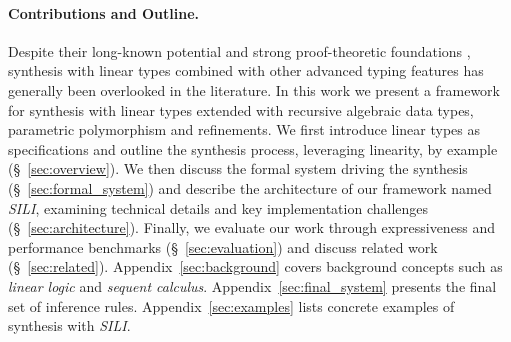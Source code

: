 \documentclass{llncs}
\newcommand{\mypara}[1]{\paragraph{\textbf{#1}.}}
\newcommand{\synname}{\emph{SILI}}
\begin{document}
\mypara{Contributions and Outline} Despite their long-known potential
\cite{Wadler90lineartypes,DBLP:journals/mscs/CairesPT16,Bernardy_2018} and
strong proof-theoretic foundations
\cite{10.1093/logcom/2.3.297,DBLP:conf/cade/ChaudhuriP05,DBLP:journals/tcs/CervesatoHP00},
synthesis with linear types combined with other advanced typing features has
generally been overlooked in the literature.  In this work we present a
framework for synthesis with linear types extended with recursive algebraic data
types, parametric polymorphism and refinements.
We first introduce linear types as specifications and outline the synthesis
process, leveraging linearity, by example (\S~\ref{sec:overview}). We then
discuss the formal system driving the synthesis (\S~\ref{sec:formal_system}) and
describe the architecture of our framework named \synname, examining technical
details and key implementation challenges (\S~\ref{sec:architecture}). Finally,
we evaluate our work through expressiveness and performance benchmarks
(\S~\ref{sec:evaluation}) and discuss related work (\S~\ref{sec:related}).
Appendix~\ref{sec:background} covers background concepts such as \emph{linear
logic} and \emph{sequent calculus}. Appendix~\ref{sec:final_system} presents
the final set of inference rules. Appendix~\ref{sec:examples} lists concrete examples
of synthesis with \synname.



\end{document}
